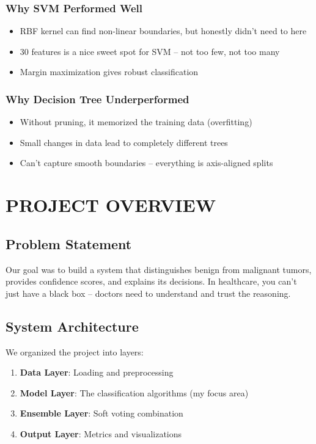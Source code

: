 \documentclass[12pt]{article}
\begin{document}
\subsubsection{Why SVM Performed Well}
\begin{itemize}
    \item RBF kernel can find non-linear boundaries, but honestly didn't need to here
    \item 30 features is a nice sweet spot for SVM -- not too few, not too many
    \item Margin maximization gives robust classification
\end{itemize}

\subsubsection{Why Decision Tree Underperformed}
\begin{itemize}
    \item Without pruning, it memorized the training data (overfitting)
    \item Small changes in data lead to completely different trees
    \item Can't capture smooth boundaries -- everything is axis-aligned splits
\end{itemize}

\newpage
\section{PROJECT OVERVIEW}

\subsection{Problem Statement}
Our goal was to build a system that distinguishes benign from malignant tumors, provides confidence scores, and explains its decisions. In healthcare, you can't just have a black box -- doctors need to understand and trust the reasoning.

\subsection{System Architecture}
We organized the project into layers:
\begin{enumerate}
    \item \textbf{Data Layer}: Loading and preprocessing
    \item \textbf{Model Layer}: The classification algorithms (my focus area)
    \item \textbf{Ensemble Layer}: Soft voting combination
    \item \textbf{Output Layer}: Metrics and visualizations
\end{enumerate}
\end{document}
